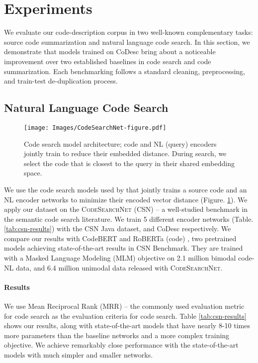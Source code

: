 \documentclass[11pt,a4paper]{article}
\begin{document}
 
\section{Experiments}
\label{sec:experiments}





We evaluate our code-description corpus in two well-known complementary tasks: source code summarization and natural language code search. In this section, we demonstrate that models trained on CoDesc bring about a noticeable improvement over two established baselines in code search and code summarization. Each benchmarking follows a standard cleaning, preprocessing, and train-test de-duplication process.






\subsection{Natural Language Code Search}

\begin{figure}
    \centering
    \texttt{[image: Images/CodeSearchNet-figure.pdf]}
    \caption{Code search model architecture; code and NL (query) encoders jointly train to reduce their embedded distance. During search, we select the code that is closest to the query in their shared embedding space.}
    \vspace{1mm}
    \label{fig:search-model}
\end{figure}


We use the code search models used by \citet{husain2019codesearchnet} that jointly trains a source code and an NL encoder networks to minimize their encoded vector distance (Figure. \ref{fig:search-model}).
We apply our dataset on the \textsc{CodeSearchNet (CSN)}  \cite{husain2019codesearchnet} -- a well-studied benchmark in the semantic code search literature. We train 5 different encoder networks (Table. \ref{tab:csn-results}) with the CSN Java dataset, and CoDesc respectively. We compare our results with CodeBERT and RoBERTa (code) \cite{codebert}, two pretrained models achieving state-of-the-art results in CSN Benchmark. They are trained with a Masked Language Modeling (MLM) \cite{bert} objective on 2.1 million bimodal code-NL data, and 6.4 million unimodal data released with \textsc{CodeSearchNet}.


\paragraph{Results} 
We use Mean Reciprocal Rank (MRR) -- the commonly used  evaluation metric for code search \cite{husain2019codesearchnet,sachdev-ncs,cambronero-unif} as the evaluation criteria for code search. Table \ref{tab:csn-results} shows our results, along with state-of-the-art models \cite{liu2019roberta, codebert} that have nearly 8-10 times more parameters than the baseline networks and a more complex training objective. We achieve remarkably close performance with the state-of-the-art models with much simpler and smaller networks.
\end{document}

